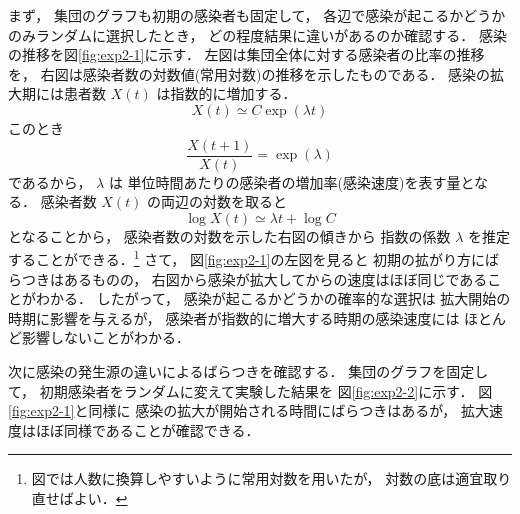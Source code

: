 \documentclass[10pt,oneside,fleqn]{scrartcl}
\begin{document}
まず，
集団のグラフも初期の感染者も固定して，
各辺で感染が起こるかどうかのみランダムに選択したとき，
どの程度結果に違いがあるのか確認する．
感染の推移を図\ref{fig:exp2-1}に示す．
左図は集団全体に対する感染者の比率の推移を，
右図は感染者数の対数値(常用対数)の推移を示したものである．
感染の拡大期には患者数 \(X(t)\) は指数的に増加する．
\begin{equation}
  X(t)\simeq C\exp(\lambda t)
\end{equation}
このとき
\begin{equation}
  \frac{X(t+1)}{X(t)}
  =\exp(\lambda)
\end{equation}
であるから，
\(\lambda\) は
単位時間あたりの感染者の増加率(感染速度)を表す量となる．
感染者数 \(X(t)\) の両辺の対数を取ると
\begin{equation}
  \log X(t) \simeq \lambda t + \log C
\end{equation}
となることから，
感染者数の対数を示した右図の傾きから
指数の係数 \(\lambda\) を推定することができる．\footnote{図では人数に換算しやすいように常用対数を用いたが，
対数の底は適宜取り直せばよい．}
さて，
図\ref{fig:exp2-1}の左図を見ると
初期の拡がり方にばらつきはあるものの，
右図から感染が拡大してからの速度はほぼ同じであることがわかる．
したがって，
感染が起こるかどうかの確率的な選択は
拡大開始の時期に影響を与えるが，
感染者が指数的に増大する時期の感染速度には
ほとんど影響しないことがわかる．

\begin{figure*}%
  \centering
\end{figure*}

次に感染の発生源の違いによるばらつきを確認する．
集団のグラフを固定して，
初期感染者をランダムに変えて実験した結果を
図\ref{fig:exp2-2}に示す．
図\ref{fig:exp2-1}と同様に
感染の拡大が開始される時間にばらつきはあるが，
拡大速度はほぼ同様であることが確認できる．

\begin{figure*}%
  \centering
\end{figure*}
\end{document}

